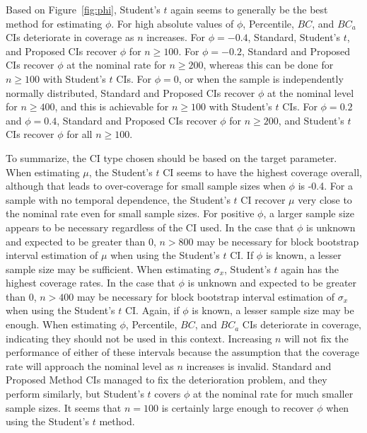 \documentclass[12pt, letterpaper, titlepage]{article}
\begin{document}
Based on Figure~\ref{fig:phi}, Student's $t$ again seems to generally
be the best method for estimating $\phi$. For high absolute values of $\phi$, 
Percentile, $BC$, and $BC_a$ CIs
deteriorate in coverage as $n$ increases. For $\phi = -0.4$, Standard, Student's
$t$, and Proposed CIs recover $\phi$ for $n \geq 100$. For $\phi = -0.2$, 
Standard and Proposed CIs recover $\phi$ at the nominal rate for $n \geq 200$, 
whereas this can be done for $n \geq 100$ with Student's $t$ CIs. For $\phi = 
0$, or when the sample
is independently normally distributed, Standard and Proposed CIs recover 
$\phi$ at the nominal level  for $n \geq 400$, and this is achievable for 
$n \geq 100$ with Student's $t$ CIs. For $\phi = 0.2$ and $\phi = 0.4$, Standard 
and Proposed CIs recover $\phi$ for $n \geq 200$, and Student's $t$ CIs 
recover $\phi$ for all $n \geq 100$.


To summarize, the CI type chosen should be based on the target parameter. 
When estimating $\mu$, the Student's $t$ CI seems to have the highest
 coverage
overall, although that leads to over-coverage for small sample sizes when $\phi$
 is -0.4. For a
sample with no temporal dependence, the Student's $t$ CI recover $\mu$ 
very close to the nominal rate even for small sample sizes. For positive $\phi$, a
larger sample size appears to be necessary regardless of the CI used. In the
case that $\phi$ is unknown and expected to be greater than $0$, $n > 800$
may be
necessary for block bootstrap interval estimation of $\mu$ when using the
Student's $t$ CI. If $\phi$ is known,
a lesser sample size may be sufficient. When estimating $\sigma_x$,
Student's $t$ again has the highest coverage
rates. In the case that $\phi$ is unknown and expected to be greater than $0$,
$n > 400$ may be necessary for block bootstrap interval estimation of
$\sigma_x$ when using the Student's $t$ CI. Again, if $\phi$ is known, a lesser
sample size may be enough.
When estimating $\phi$, Percentile, $BC$, and $BC_a$ CIs 
deteriorate in coverage, indicating they should not be used in this context. 
Increasing $n$ will not fix the performance of either of these intervals 
because the assumption that the coverage rate will approach the nominal level
as $n$ increases is invalid. Standard and Proposed Method CIs managed to fix
the
deterioration problem, and they perform similarly, but Student's $t$ covers
$\phi$ at the nominal rate for much smaller sample sizes. It seems that 
$n = 100$ is certainly large enough to
recover $\phi$ when using the Student's $t$ method.
\end{document}
